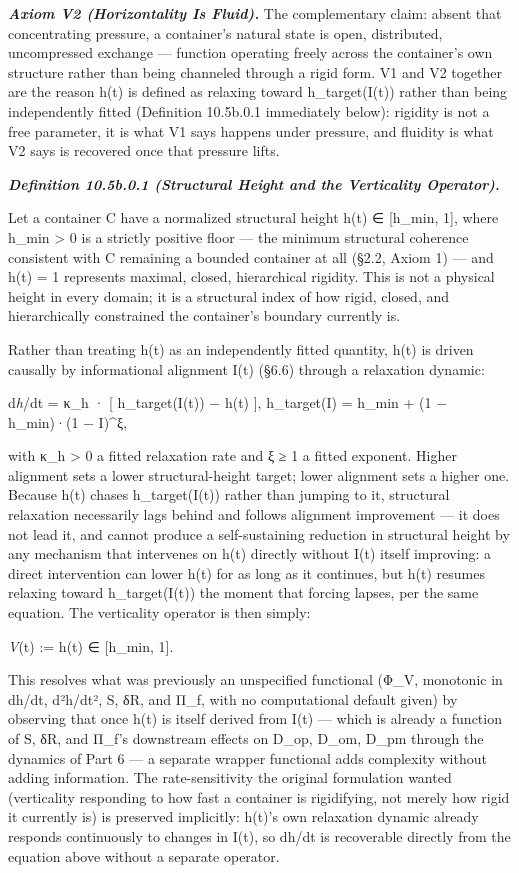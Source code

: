 \documentclass[
]{article}
\begin{document}
\emph{\textbf{Axiom V2 (Horizontality Is Fluid).}} The complementary
claim: absent that concentrating pressure, a container's natural state
is open, distributed, uncompressed exchange --- function operating
freely across the container's own structure rather than being channeled
through a rigid form. V1 and V2 together are the reason h(t) is defined
as relaxing toward h\_target(I(t)) rather than being independently
fitted (Definition 10.5b.0.1 immediately below): rigidity is not a free
parameter, it is what V1 says happens under pressure, and fluidity is
what V2 says is recovered once that pressure lifts.

\emph{\textbf{Definition 10.5b.0.1 (Structural Height and the
Verticality Operator).}}

Let a container C have a normalized structural height h(t) ∈ {[}h\_min,
1{]}, where h\_min \textgreater{} 0 is a strictly positive floor --- the
minimum structural coherence consistent with C remaining a bounded
container at all (§2.2, Axiom 1) --- and h(t) = 1 represents maximal,
closed, hierarchical rigidity. This is not a physical height in every
domain; it is a structural index of how rigid, closed, and
hierarchically constrained the container's boundary currently is.

Rather than treating h(t) as an independently fitted quantity, h(t) is
driven causally by informational alignment I(t) (§6.6) through a
relaxation dynamic:

d\emph{h}/dt = κ\_h · {[} h\_target(I(t)) − h(t) {]}, h\_target(I) =
h\_min + (1 − h\_min)·(1 − I)\^{}ξ,

with κ\_h \textgreater{} 0 a fitted relaxation rate and ξ ≥ 1 a fitted
exponent. Higher alignment sets a lower structural-height target; lower
alignment sets a higher one. Because h(t) chases h\_target(I(t)) rather
than jumping to it, structural relaxation necessarily lags behind and
follows alignment improvement --- it does not lead it, and cannot
produce a self-sustaining reduction in structural height by any
mechanism that intervenes on h(t) directly without I(t) itself
improving: a direct intervention can lower h(t) for as long as it
continues, but h(t) resumes relaxing toward h\_target(I(t)) the moment
that forcing lapses, per the same equation. The verticality operator is
then simply:

\emph{V}(t) := h(t) ∈ {[}h\_min, 1{]}.

This resolves what was previously an unspecified functional (Φ\_V,
monotonic in dh/dt, d²h/dt², S, δR, and Π\_f, with no computational
default given) by observing that once h(t) is itself derived from I(t)
--- which is already a function of S, δR, and Π\_f's downstream effects
on D\_op, D\_om, D\_pm through the dynamics of Part 6 --- a separate
wrapper functional adds complexity without adding information. The
rate-sensitivity the original formulation wanted (verticality responding
to how fast a container is rigidifying, not merely how rigid it
currently is) is preserved implicitly: h(t)'s own relaxation dynamic
already responds continuously to changes in I(t), so dh/dt is
recoverable directly from the equation above without a separate
operator.
\end{document}
